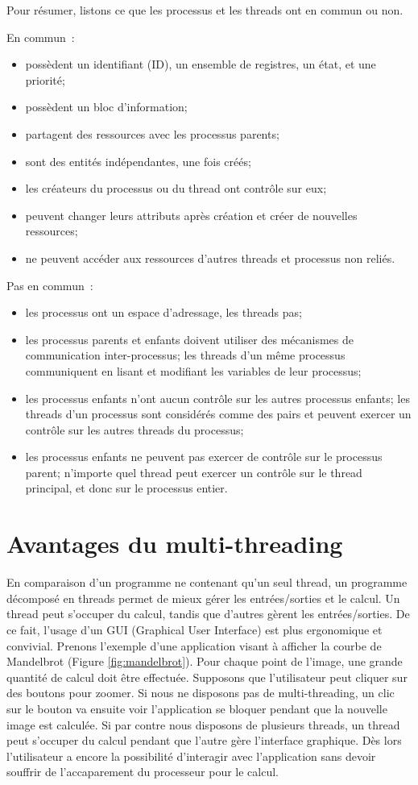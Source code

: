 Pour résumer, listons ce que les processus et les threads ont en commun ou non.

En commun~:
\begin{itemize}
\item possèdent un identifiant (ID), un ensemble de registres, un état, et une priorité;
\item possèdent un bloc d'information;
\item partagent des ressources avec les processus parents;
\item sont des entités indépendantes, une fois créés;
\item les créateurs du processus ou du thread ont contrôle sur eux;
\item peuvent changer leurs attributs après création et créer de nouvelles ressources;
\item ne peuvent accéder aux ressources d'autres threads et processus non reliés.
\end{itemize}

Pas en commun~:
\begin{itemize}
\item les processus ont un espace d'adressage, les threads pas;
\item les processus parents et enfants doivent utiliser des mécanismes de communication inter-processus; les threads d'un même processus communiquent en lisant et modifiant les variables de leur processus;
\item les processus enfants n'ont aucun contrôle sur les autres processus enfants; les threads d'un processus sont considérés comme des pairs et peuvent exercer un contrôle sur les autres threads du processus;
\item les processus enfants ne peuvent pas exercer de contrôle sur le processus parent; n'importe quel thread peut exercer un contrôle sur le thread principal, et donc sur le processus entier.
\end{itemize}


\section{Avantages du multi-threading}

En comparaison d'un programme ne contenant qu'un seul thread, un programme décomposé en threads permet de mieux gérer les entrées/sorties et le calcul. Un thread peut s'occuper du calcul, tandis que d'autres gèrent les entrées/sorties. De ce fait, l'usage d'un GUI (Graphical User Interface) est plus ergonomique et convivial. Prenons l'exemple d'une application visant à afficher la courbe de Mandelbrot (Figure \ref{fig:mandelbrot}). Pour chaque point de l'image, une grande quantité de calcul doit être effectuée. Supposons que l'utilisateur peut cliquer sur des boutons pour zoomer. Si nous ne disposons pas de multi-threading, un clic sur le bouton va ensuite voir l'application se bloquer pendant que la nouvelle image est calculée. Si par contre nous disposons de plusieurs threads, un thread peut s'occuper du calcul pendant que l'autre gère l'interface graphique. Dès lors l'utilisateur a encore la possibilité d'interagir avec l'application sans devoir souffrir de l'accaparement du processeur pour le calcul.


